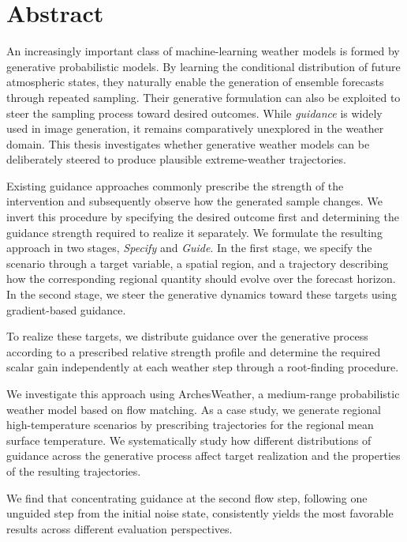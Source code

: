 \documentclass[12pt,a4paper,english,oneside]{book}
\begin{document}
\thispagestyle{empty}
\titleGP
\newpage
\onehalfspacing
\setcounter{page}{1}

\section*{Abstract}

An increasingly important class of machine-learning weather models is formed
by generative probabilistic models. By learning the conditional distribution
of future atmospheric states, they naturally enable the generation of ensemble
forecasts through repeated sampling. Their generative formulation can also be
exploited to steer the sampling process toward desired outcomes.
While \emph{guidance} is widely used in image generation, it remains
comparatively unexplored in the weather domain. This thesis investigates
whether generative weather models can be deliberately steered to produce
plausible extreme-weather trajectories.

Existing guidance approaches commonly prescribe the strength of the
intervention and subsequently observe how the generated sample changes. We
invert this procedure by specifying the desired outcome first and determining
the guidance strength required to realize it separately. We formulate the
resulting approach in two stages, \emph{Specify} and \emph{Guide}. In the first
stage, we specify the scenario through a target variable, a spatial region, and
a trajectory describing how the corresponding regional quantity should evolve
over the forecast horizon. In the second stage, we steer the generative
dynamics toward these targets using gradient-based guidance.

To realize these targets, we distribute guidance over the generative process
according to a prescribed relative strength profile and determine the required
scalar gain independently at each weather step through a root-finding
procedure.

We investigate this approach using ArchesWeather, a medium-range probabilistic
weather model based on flow matching. As a case study, we generate regional
high-temperature scenarios by prescribing trajectories for the regional mean
surface temperature. We systematically study how different distributions of guidance across the
generative process affect target realization and the properties of the
resulting trajectories.

We find that concentrating guidance at the second flow step, following one unguided step from the initial noise state, consistently yields the most favorable results across different evaluation perspectives.
\end{document}
